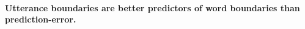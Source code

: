 




\paragraph{Utterance boundaries are better predictors of word boundaries than prediction-error.}

